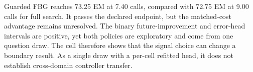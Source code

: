Guarded FBG reaches 73.25 EM at 7.40 calls, compared with 72.75 EM at 9.00
calls for full search. It passes the declared endpoint, but the
matched-cost advantage remains unresolved. The binary future-improvement and
error-head intervals are positive, yet both policies are exploratory and come
from one question draw.
The cell therefore shows that the signal choice can change a boundary result.
As a single draw with a per-cell refitted head, it does not establish
cross-domain controller transfer.
